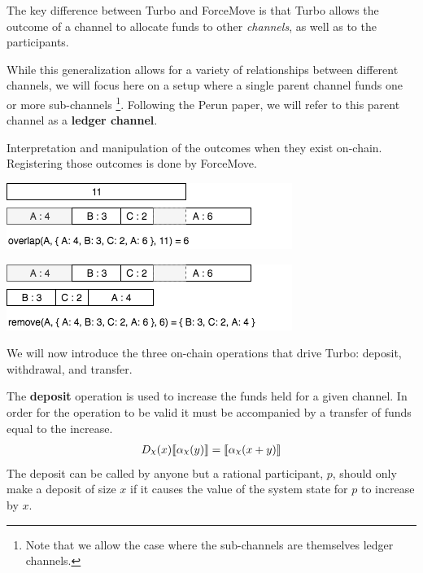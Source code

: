 \documentclass{article}
\DeclareRobustCommand{\rchi}{{\mathpalette\irchi\relax}}
\newcommand{\irchi}[2]{\raisebox{\depth}{$#1\chi$}} %
\theoremstyle{definition}
\newcommand{\adj}[1]{\llbracket #1 \rrbracket}
\begin{document}
The key difference between Turbo and ForceMove is that Turbo allows the outcome of a channel to allocate funds to other \textit{channels}, as well as to the participants.

While this generalization allows for a variety of relationships between different channels,
we will focus here on a setup where a single parent channel funds one or more sub-channels
\footnote{Note that we allow the case where the sub-channels are themselves ledger channels.}.
Following the Perun paper, we will refer to this parent channel as a \textbf{ledger channel}.

Interpretation and manipulation of the outcomes when they exist on-chain. Registering those
outcomes is done by ForceMove.

\begin{center}
  \includegraphics[scale=0.7]{overlap} %
\end{center}


\begin{center}
  \includegraphics[scale=0.7]{remove} %
\end{center}


We will now introduce the three on-chain operations that drive Turbo: deposit, withdrawal,
and transfer.


The \textbf{deposit} operation is used to increase the funds held for a given channel.
In order for the operation to be valid it must be accompanied by a transfer of funds equal 
to the increase.
\begin{align*}
D_\rchi(x) \adj{\alpha_\rchi(y)} = \adj{\alpha_\rchi(x + y)}
\end{align*}
The deposit can be called by anyone but a rational participant, $p$, should only make a
deposit of size $x$ if it causes the value of the system state for $p$ to increase by $x$.
\end{document}
